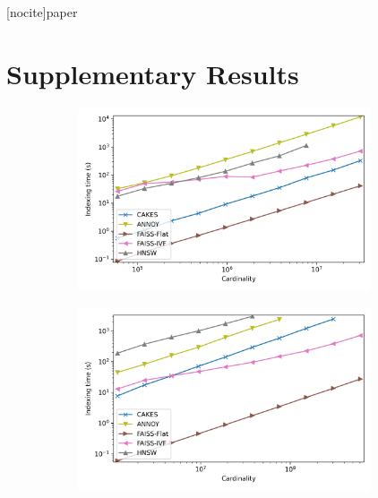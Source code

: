 \documentclass[review,supplement,onefignum,onetabnum]{siamonline220329}
\begin{document}
\ifpdf
{}
\fi



[nocite]{paper}

\maketitle


\section{Supplementary Results}

\begin{figure}
    \begin{subfigure}[b]{0.47\textwidth}
        \includegraphics[width=0.95\textwidth]{plots/fashion-mnist-indexing.png}\\
        \label{fig:supplement:fashion-mnist-indexing}
    \end{subfigure}%
    \begin{subfigure}[b]{0.47\textwidth}
        \includegraphics[width=0.95\textwidth]{plots/glove-25-indexing.png}\\

\end{subfigure}
\end{figure}
\end{document}
